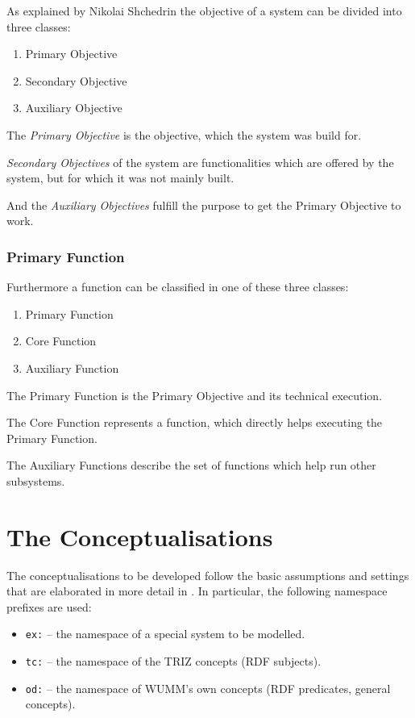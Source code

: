\documentclass[11pt,a4paper]{article}
\begin{document}
As explained by Nikolai Shchedrin the objective of a system can be divided
into three classes:
\begin{enumerate}
\item Primary Objective
\item Secondary Objective
\item Auxiliary Objective
\end{enumerate}

The \emph{Primary Objective} is the objective, which the system was build for.

\emph{Secondary Objectives} of the system are functionalities which are
offered by the system, but for which it was not mainly built.

And the \emph{Auxiliary Objectives} fulfill the purpose to get the Primary
Objective to work.

\subsubsection{Primary Function}
\label{subsubsec:primary_function}

Furthermore a function can be classified in one of these three classes:
\begin{enumerate}
\item Primary Function
\item Core Function
\item Auxiliary Function
\end{enumerate}

The Primary Function is the Primary Objective and its technical execution. 

The Core Function represents a function, which directly helps executing the
Primary Function.

The Auxiliary Functions describe the set of functions which help run other
subsystems.

\section{The Conceptualisations}
\label{sec:conceptualisations}

The conceptualisations to be developed follow the basic assumptions and
settings that are elaborated in more detail in \cite{Graebe2021}. In
particular, the following namespace prefixes are used:
\begin{itemize}
\item \texttt{ex:} -- the namespace of a special system to be modelled. 
\item \texttt{tc:} -- the namespace of the TRIZ concepts (RDF subjects).
\item \texttt{od:} -- the namespace of WUMM's own concepts (RDF predicates,
  general concepts).
\end{itemize}
\end{document}
